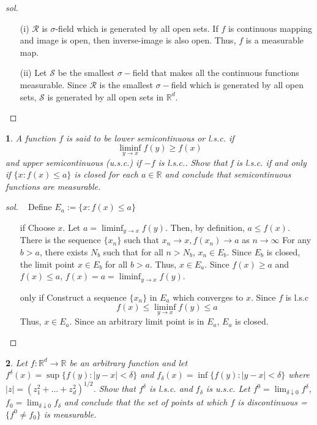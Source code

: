 \documentclass{report}
\newtheorem{ex}{}[section]
\begin{document}
\begin{proof}[sol]~
\begin{enumerate}
    \item[(i)] $\mathcal{R}$ is $\sigma$-field which is generated by all open sets. If $f$ is continuous mapping and image is open, then inverse-image is also open. Thus, $f$ is a measurable map.
    \item[(ii)] Let $\mathcal{S}$ be the smallest $\sigma-$field that makes all the continuous functions measurable. Since $\mathcal{R}$ is the smallest $\sigma-$field which is generated by all open sets,  $\mathcal{S}$ is generated by all open sets in $\mathbb{R}^d$.
\end{enumerate}
\end{proof}
\begin{ex}
A function $f$ is said to be lower semicontinuous or l.s.c. if
\[\liminf_{y\to x} f(y) \ge f(x)\]
and upper semicontinuous (u.s.c.) if $-f$ is l.s.c.. Show that f is l.s.c. if
and only if $\{x : f(x) \le a\}$ is closed for each $a \in \mathbb{R}$ and conclude that
semicontinuous functions are measurable.
\end{ex}
\begin{proof}[sol]~
Define $E_a := \{x : f(x) \le a\}$
\begin{enumerate}
    \item[if] Choose $x$. Let $a = \liminf_{y\to x}{f(y)}$. Then, by definition, $a \le f(x)$.
    There is the sequence $\{x_n\}$ such that $x_n \to x, f(x_n) \to a$ as $n \to \infty$
    For any $b > a$, there exists $N_b$ such that for all $n > N_b$, $x_n \in E_b$. Since $E_b$ is closed, the limit point $x \in E_b$ for all $b > a$. Thus, $x \in E_a$. Since $f(x) \ge a$ and $f(x) \le a$, $f(x) = a = \liminf_{y\to x} f(y)$. 
    \item[only if] Construct a sequence $\{x_n\}$ in $E_a$ which converges to $x$. Since $f$ is l.s.c
    \[f(x) \le \liminf_{y\to x} f(y) \le a\]
    Thus, $x \in E_a$. Since an arbitrary limit point is in $E_a$, $E_a$ is closed.
\end{enumerate}
\end{proof}
\begin{ex}
Let $f : \mathbb{R}^d \to \mathbb{R}$ be an arbitrary function and let $f^\delta (x) = \sup \{f(y) : |y - x| < \delta\}$ and $f_\delta(x) = \inf \{f(y) : |y - x| < \delta\}$ where $|z| = (z_1^2 + ... + z_d^2)^{1/2}$. Show that $f^\delta$ is l.s.c. and $f_\delta$ is u.s.c. Let $f^0 = \lim_{\delta \downarrow0}f^\delta$, $f_0 = \lim_{\delta \downarrow0}f_\delta$ and conclude that the set of points at which $f$ is discontinuous = $\{f^0 \ne f_0\}$ is measurable.
\end{ex}
\end{document}
